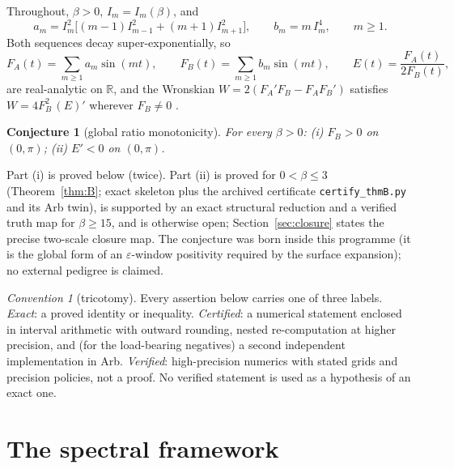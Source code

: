 \documentclass[11pt]{article}
\newtheorem{conjecture}[theorem]{Conjecture}
\theoremstyle{remark}
\newtheorem{convention}[theorem]{Convention}
\newcommand{\FA}{F_{\!A}}
\newcommand{\FB}{F_{\!B}}
\begin{document}
Throughout, $\beta>0$, $I_m=I_m(\beta)$, and
\begin{equation}\label{eq:coeffs}
a_m = I_m^2\bigl[(m-1)I_{m-1}^2+(m+1)I_{m+1}^2\bigr],\qquad
b_m = m\,I_m^4,\qquad m\ge1 .
\end{equation}
Both sequences decay super-exponentially, so
\begin{equation}\label{eq:FAFB}
\FA(t)=\sum_{m\ge1}a_m\sin(mt),\qquad
\FB(t)=\sum_{m\ge1}b_m\sin(mt),\qquad
E(t)=\frac{\FA(t)}{2\FB(t)},
\end{equation}
are real-analytic on $\mathbb{R}$, and the Wronskian
$W=2(\FA'\FB-\FA\FB')$ satisfies $W=4\FB^2\,(E)'$ wherever $\FB\neq0$
\cite{WronskianNote}.

\begin{conjecture}[global ratio monotonicity]\label{conj:main}
For every $\beta>0$: \textup{(i)} $\FB>0$ on $(0,\pi)$;
\textup{(ii)} $E'<0$ on $(0,\pi)$.
\end{conjecture}

Part (i) is proved below (twice). Part (ii) is proved for $0<\beta\le3$
(Theorem~\ref{thm:B}; exact skeleton plus the archived certificate
\texttt{certify\_thmB.py} and its Arb twin), is supported by an exact
structural reduction and a verified truth map for $\beta\ge15$, and is
otherwise open; Section~\ref{sec:closure} states the precise two-scale
closure map. The conjecture was born inside this programme (it is the
global form of an $\varepsilon$-window positivity required by the surface
expansion); no external pedigree is claimed.

\begin{convention}[tricotomy]\label{conv:tri}
Every assertion below carries one of three labels. \emph{Exact}: a proved
identity or inequality. \emph{Certified}: a numerical statement enclosed
in interval arithmetic with outward rounding, nested re-computation at
higher precision, and (for the load-bearing negatives) a second
independent implementation in Arb. \emph{Verified}: high-precision
numerics with stated grids and precision policies, not a proof. No
verified statement is used as a hypothesis of an exact one.
\end{convention}

\section{The spectral framework}\label{sec:frame}
\end{document}
